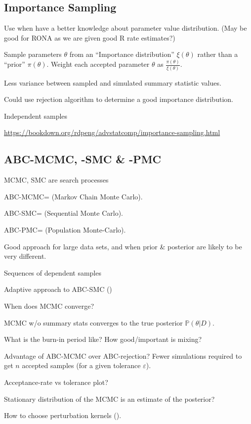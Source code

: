 \documentclass[11pt,a4paper,margin=0]{article}
\newcommand*{\prob}{\mathbb{P}}
\theoremstyle{break}
\begin{document}
\subsection{Importance Sampling}\label{sec_ABC_IS}

  \par Use when have a better knowledge about parameter value distribution. (May be good for RONA as we are given good R rate estimates?)
  \par Sample parameters $\theta$ from an ``Importance distribution'' $\xi(\theta)$ rather than a ``prior'' $\pi(\theta)$. Weight each accepted parameter $\theta$ as $\frac{\pi(\theta)}{\xi(\theta)}$.
  \par Less variance between sampled and simulated summary statistic values.
  \par Could use rejection algorithm to determine a good importance distribution.
  \par Independent samples
  \par \url{https://bookdown.org/rdpeng/advstatcomp/importance-sampling.html}

\subsection*{ABC-MCMC, -SMC \& -PMC}\label{sec_ABC_MCMC}

  \par MCMC, SMC are search processes
  \par ABC-MCMC=\cite[]{mcmc_wo_likelihood} (Markov Chain Monte Carlo).
  \par ABC-SMC=\cite[]{SMC_wo_likelihood} (Sequential Monte Carlo).
  \par ABC-PMC=\cite[]{adaptive_ABC} (Population Monte-Carlo).
  \par Good approach for large data sets, and when prior \& posterior are likely to be very different.
  \par Sequences of dependent samples
  \par Adaptive approach to ABC-SMC (\cite[]{adaptive_SMC_method_for_ABC})
  \par When does MCMC converge?
  \par MCMC w/o summary stats converges to the true posterior $\prob(\theta|D)$.
  \par What is the burn-in period like? How good/important is mixing?
  \par Advantage of ABC-MCMC over ABC-rejection? Fewer simulations required to get $n$ accepted samples (for a given tolerance $\varepsilon$).
  \par Acceptance-rate vs tolerance plot?
  \par Stationary distribution of the MCMC is an estimate of the posterior?
  \par How to choose perturbation kernels (\cite[]{on_optimality_of_kernels_for_approximate_bayesian_computation_using_SMC}).
\end{document}
